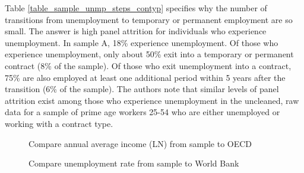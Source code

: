 Table \ref{table_sample_unmp_steps_contyp} specifies why the number of transitions from unemployment to temporary or permanent employment are so small.  The answer is high panel attrition for individuals who experience unemployment.  In sample A, 18\% experience unemployment.  Of those who experience unemployment, only about 50\% exit into a temporary or permanent contract (8\% of the sample).  Of those who exit unemployment into a contract, 75\% are also employed at least one additional period within 5 years after the transition (6\% of the sample).  The authors note that similar levels of panel attrition exist among those who experience unemployment in the uncleaned, raw data for a sample of prime age workers 25-54 who are either unemployed or working with a contract type.  


\begin{figure}
    \caption{Compare annual average income (LN) from sample to OECD}
    \label{graph_descriptives_income_better_paper.pdf}
\end{figure}

\begin{figure}
    \caption{Compare unemployment rate from sample to World Bank}
    \label{graph_descriptives_unmp_paper}
\end{figure}


